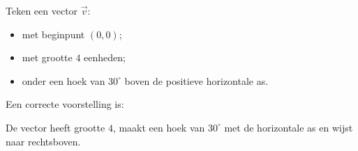 \documentclass{ximera}
\begin{document}
\begin{oefening}{\oefB}

\begin{question}
Teken een vector $\vec{v}$:

\begin{itemize}
    \item met beginpunt $(0,0)$;
    \item met grootte $4$ eenheden;
    \item onder een hoek van $30^\circ$ boven de positieve horizontale as.
\end{itemize}

\begin{oplossing}
Een correcte voorstelling is:

\begin{center}
\end{center}

De vector heeft grootte $4$, maakt een hoek van $30^\circ$ met de
horizontale as en wijst naar rechtsboven.
\end{oplossing}
\end{question}

\end{oefening}
\end{document}

